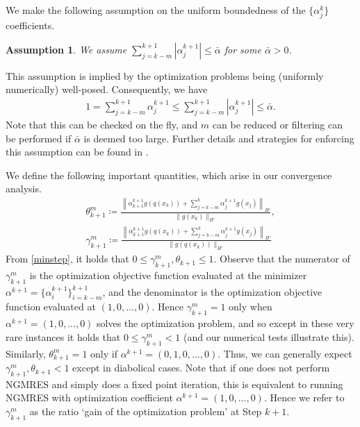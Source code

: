 \documentclass{article}
\numberwithin{equation}{section}
\newtheorem{assumption}[thm]{Assumption}
\begin{document}
We make the following assumption on the uniform boundedness of the $\{ \alpha_j^k \}$ coefficients. 
\begin{assumption}
\label{assum3}
    We assume $\sum\limits_{j=k-m}^{k+1} |\alpha_j^{k+1}|\le \bar \alpha$ for some $\bar\alpha>0$.
\end{assumption}
This assumption is implied by the optimization problems being (uniformly numerically) well-posed.  
Consequently, we have \begin{align}
1 = \sum_{j=k-m}^{k+1} \alpha_j^{k+1} \le \sum_{j=k-m}^{k+1} |\alpha_j^{k+1}| \le \bar\alpha.
\label{alphabd}
\end{align}
Note that this can be checked on the fly, and $m$ can be reduced or filtering can be performed if $\bar\alpha$ is deemed too large. Further details and strategies for enforcing this assumption can be found in \cite{PR23,PR25,K18}.


 

We define the following important quantities, which arise in our convergence analysis.
\begin{align}
\label{eqn:theta}
    \theta^m_{k+1}\coloneqq \frac{\left\|\alpha_{k+1}^{k+1} g(q(x_k)) + \sum\limits_{j=k-m}^k \alpha^{k+1}_j g(x_j) \right\|_{H'} }{\|g(x_k)\|_{H'}}, \\
    \label{eqn:gamma}
    \gamma^m_{k+1}  \coloneqq \frac{\left\|\alpha_{k+1}^{k+1} g(q(x_k)) + \sum\limits_{j=k-m}^k \alpha^{k+1}_j g(x_j) \right\|_{H'}}{\|g(q(x_k))\|_{H'}}
\end{align}
From  \eqref{minstep}, it holds that $0\le \gamma^m_{k+1},\theta_{k+1} \le 1$.  Observe that the numerator of $\gamma^m_{k+1}$ is the optimization objective function evaluated at the minimizer $\alpha^{k+1}=\{ \alpha^{k+1}_i \}_{i=k-m}^{k+1}$, and the denominator is the optimization objective function evaluated at $(1,0,...,0)$.  
Hence $\gamma^m_{k+1}=1$ only
when $\alpha^{k+1}=(1,0,...,0)$ solves the optimization problem, and so except in these very rare instances it holds that  $0\le \gamma^m_{k+1}<1$ (and our numerical tests illustrate this).  Similarly, $\theta^m_{k+1} = 1$ only if $\alpha^{k+1}=(0,1,0,...,0)$.  Thus, we can generally expect $\gamma^m_{k+1},\theta_{k+1} < 1$ except in diabolical cases.  Note that if one does not perform NGMRES and simply does a fixed point iteration, this is equivalent to running NGMRES with optimization coefficient $\alpha^{k+1}=(1,0,...,0)$.  Hence we refer to $\gamma^m_{k+1}$ as the ratio `gain of the optimization problem' at Step $k+1$.
\end{document}
